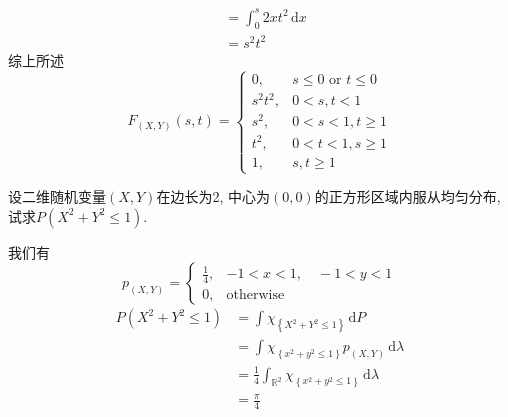 \documentclass[../main.tex]{subfiles}
\begin{document}
\begin{solution}
\begin{enumerate}
\[\begin{aligned}
     &=  \int_{0}^{s} 2xt^{2}\,\mathrm{d} x\\ 
      &= s^{2}t^{2} 
    \end{aligned}
    \]综上所述 \[
    F_{\left( X,Y \right) }\left( s,t \right)= \begin{cases} 0, &s\le 0\text{ or }t\le 0\\ 
     s^{2}t^{2}, &  0< s,t< 1\\ 
    s^{2},&  0< s< 1, t\ge 1\\ 
     t^{2},& 0< t< 1, s\ge 1\\ 
      1,& s,t\ge 1   \end{cases}  
    \]
  \end{enumerate}
  
\end{solution}

\begin{exercise}{}{}
设二维随机变量$(X,Y)$在边长为2, 中心为$(0,0)$的正方形区域内服从均匀分布, 试求$P(X^2+Y^2 \leq 1)$.
\end{exercise}
\begin{solution}
  我们有 \[
p_{\left( X,Y \right) }= \begin{cases} \frac{1 }{4 }, & -1< x< 1,\quad -1< y< 1\\ 
 0,& \text{otherwise}  \end{cases} 
\] \[
\begin{aligned}
P\left( X^{2}+ Y^{2}\le 1 \right)&= \int \chi _{\left\{ X^{2}+ Y^{2}\le 1 \right\}}\,\mathrm{d} P\\ 
 &= \int \chi _{\left\{ x^{2}+ y^{2}\le 1 \right\}}  p_{\left( X,Y \right) }\,\mathrm{d}  \lambda \\ 
  &= \frac{1 }{4 } \int _{\mathbb{R} ^{2}}\chi _{\left\{ x^{2}+ y^{2}\le 1 \right\}} \,\mathrm{d}  \lambda \\ 
   &= \frac{ \pi  }{4 }  
\end{aligned}
\]
\end{solution}
\end{document}

